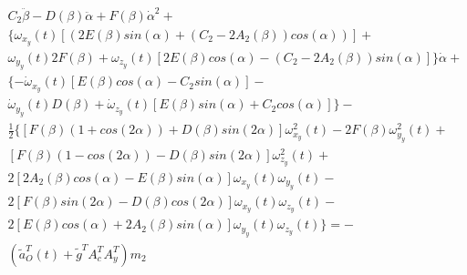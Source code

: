 \begin{equation}%
\label{eq:p3:47}
\begin{multlined}
C_{2} \ddot \beta -
D \left( \beta \right) \ddot \alpha +
F \left( \beta \right) \dot{\alpha}^{2}+ \\
\lbrace 
	\omega _{x_{y}} \left( t \right) \left[ \left( 2E \left( \beta \right) sin \left( \alpha \right) + \left( C_{2}-2A_{2} \left( \beta \right) \right) cos \left( \alpha \right) \right) \right] + \\ 
	\omega _{y_{y}} \left( t \right) 2F \left( \beta \right) + 
	\omega _{z_{y}} \left( t \right) \left[ 2E \left( \beta \right) cos \left( \alpha \right) - \left( C_{2}-2A_{2} \left( \beta \right) \right) sin \left( \alpha \right) \right] 
\rbrace 
\dot \alpha +\\
\lbrace 
	- \dot \omega _{x_{y}} \left( t \right) \left[ E \left( \beta \right) cos \left( \alpha \right) -C_{2}^{}sin \left( \alpha \right) \right] - \\ 
	\dot \omega _{y_{y}} \left( t \right) D \left( \beta \right) + 
	\dot \omega _{z_{y}} \left( t \right) \left[ E \left( \beta \right) sin \left( \alpha \right) +C_{2}cos \left( \alpha \right) \right] 
\rbrace -\\
\frac{1}{2} 
\lbrace 
	\left[ 
		F \left( \beta \right) \left( 1+cos \left( 2 \alpha \right) \right) +D \left( \beta \right) sin \left( 2 \alpha \right) \right] \omega _{x_{y}}^{2} \left( t \right) -
		2F \left( \beta \right) \omega _{y_{y}}^{2} \left( t \right) +\\
		\left[ F \left( \beta \right) \left( 1-cos \left( 2 \alpha \right) \right) -D \left( \beta \right) sin \left( 2 \alpha \right) \right] \omega _{z_{y}}^{2} \left( t \right) +\\
		2 \left[ 2A_{2} \left( \beta \right) cos \left( \alpha \right) -E \left( \beta \right) sin \left( \alpha \right) \right] \omega _{x_{y}} \left( t \right) \omega _{y_{y}} \left( t \right) -\\
		2 \left[ F \left( \beta \right) sin \left( 2 \alpha \right) -D \left( \beta \right) cos \left( 2 \alpha \right) \right] \omega _{x_{y}} \left( t \right) \omega _{z_{y}} \left( t \right) - \\
		2 \left[ E \left( \beta \right) cos \left( \alpha \right) +2A_{2} \left( \beta \right) sin \left( \alpha \right) \right] \omega _{y_{y}} \left( t \right) \omega _{z_{y}} \left( t \right) 
\rbrace 
= -\\
\left( \tilde{a}_{O}^{T} \left( t \right) +\tilde{g}^{T}A_{c}^{T}A_{y}^{T} \right) m_{2} 

\end{multlined}
\end{equation}
